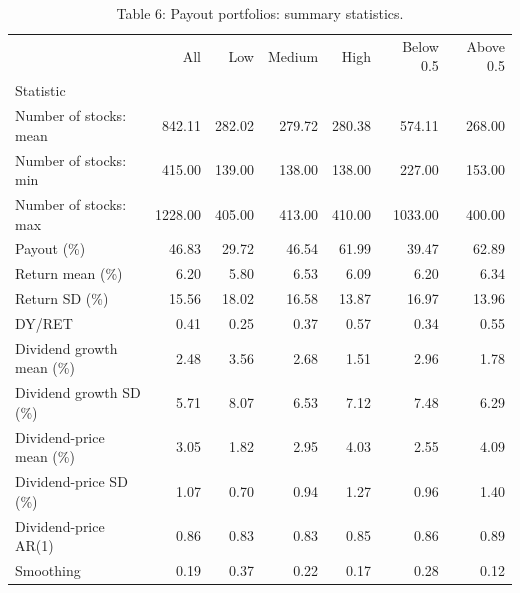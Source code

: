 \begin{table}
\caption{Table 6: Payout portfolios: summary statistics.}
\label{tab:replication_6}
\begin{tabular}{lrrrrrr}
\toprule
 & All & Low & Medium & High & Below 0.5 & Above 0.5 \\
Statistic &  &  &  &  &  &  \\
\midrule
Number of stocks: mean & 842.11 & 282.02 & 279.72 & 280.38 & 574.11 & 268.00 \\
Number of stocks: min & 415.00 & 139.00 & 138.00 & 138.00 & 227.00 & 153.00 \\
Number of stocks: max & 1228.00 & 405.00 & 413.00 & 410.00 & 1033.00 & 400.00 \\
Payout (\%) & 46.83 & 29.72 & 46.54 & 61.99 & 39.47 & 62.89 \\
Return mean (\%) & 6.20 & 5.80 & 6.53 & 6.09 & 6.20 & 6.34 \\
Return SD (\%) & 15.56 & 18.02 & 16.58 & 13.87 & 16.97 & 13.96 \\
DY/RET & 0.41 & 0.25 & 0.37 & 0.57 & 0.34 & 0.55 \\
Dividend growth mean (\%) & 2.48 & 3.56 & 2.68 & 1.51 & 2.96 & 1.78 \\
Dividend growth SD (\%) & 5.71 & 8.07 & 6.53 & 7.12 & 7.48 & 6.29 \\
Dividend-price mean (\%) & 3.05 & 1.82 & 2.95 & 4.03 & 2.55 & 4.09 \\
Dividend-price SD (\%) & 1.07 & 0.70 & 0.94 & 1.27 & 0.96 & 1.40 \\
Dividend-price AR(1) & 0.86 & 0.83 & 0.83 & 0.85 & 0.86 & 0.89 \\
Smoothing & 0.19 & 0.37 & 0.22 & 0.17 & 0.28 & 0.12 \\
\bottomrule
\end{tabular}
\end{table}
